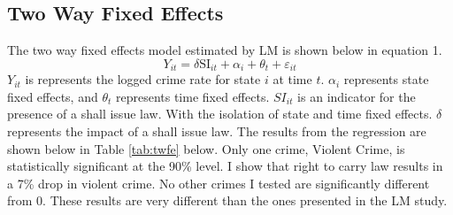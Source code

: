 \documentclass{article}
\begin{document}
\subsection*{Two Way Fixed Effects}
The two way fixed effects model estimated by LM is shown below in equation 1.
\begin{equation}
Y_{it} = \delta\text{SI}_{it} + \alpha_i + \theta_t + \varepsilon_{it}
\end{equation}
$Y_{it}$ is represents the logged crime rate for state $i$ at time $t$. $\alpha_i$ represents state fixed effects, and $\theta_t$ represents time fixed effects. $SI_{it}$ is an indicator for the presence of a shall issue law. With the isolation of state and time fixed effects. $\delta$ represents the impact of a shall issue law. The results from the regression are shown below in Table \ref{tab:twfe} below. Only one crime, Violent Crime, is statistically significant at the 90\% level. I show that right to carry law results in a 7\% drop in violent crime. No other crimes I tested are significantly different from 0. These results are very different than the ones presented in the LM study.
    \scriptsize
\end{document}
